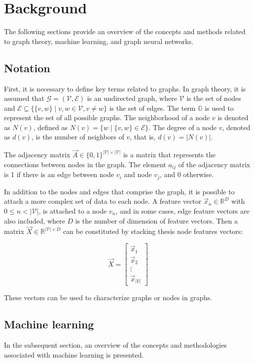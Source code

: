 \chapter{Background}\label{chap:background}
The following sections provide an overview of the concepts and methods related to graph theory, machine learning, and graph neural networks. 

\section{Notation}
First, it is necessary to define key terms related to graphs. In graph theory, it is assumed that $\mathcal{G}=(\mathcal{V},\mathcal{E})$ is an undirected graph, where $\mathcal{V}$ is the set of nodes and $\mathcal{E}  \subseteq \{\{v,w\}\mid v,w \in \mathcal{V} , v \neq w\}$ is the set of edges. The term $\mathbb{G}$ is used to represent the set of all possible graphs. The neighborhood of a node $v$ is denoted as $N(v)$, defined as $N(v) = \{w \mid \{v,w\} \in \mathcal{E}\}$. The degree of a node $v$, denoted as $d(v)$, is the number of neighbors of $v$, that is, $d(v) = |N(v)|$. 

The adjacency matrix $\vec{A} \in \{0,1\}^{|\mathcal{V}| \times |\mathcal{V}|}$ is a matrix that represents the connections between nodes in the graph. The element $a_{ij}$ of the adjacency matrix is 1 if there is an edge between node $v_i$ and node $v_j$, and 0 otherwise.

In addition to the nodes and edges that comprise the graph, it is possible to attach a more complex set of data to each node. A feature vector $\vec{x}_n\in \mathbb{R}^D$ with $0 \leq n < |\mathcal{V}|$, is attached to a node $v_n$, and in some cases, edge feature vectors are also included, where $D$ is the number of dimension of feature vectors. Then a matrix $\vec{X} \in \mathbb{R}^{|\mathcal{V}|\times D}$ can be constituted by stacking thesis node features vectors:

$$
    \vec{X} = \begin{bmatrix}
    \vec{x}_1 \\
    \vec{x}_2 \\
    \vdots \\
    \vec{x}_{|V|}
    \end{bmatrix}
$$

These vectors can be used to characterize graphs or nodes in graphs.

\section{Machine learning}
In the subsequent section, an overview of the concepts and methodologies associated with machine learning is presented. 

